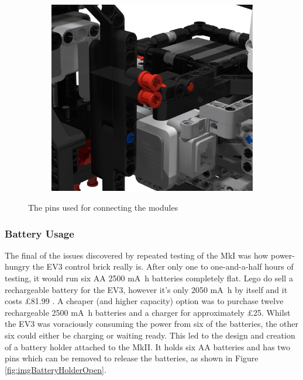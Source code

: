\documentclass{report}
\begin{document}
\begin{figure}[H]
\begin{subfigure}[b]{0.25\textwidth}
			\label{fig:rdrModulePins2}
		\end{subfigure}
		\hspace{10mm}
		\begin{subfigure}[b]{0.25\textwidth}
			\includegraphics[width=\textwidth]{Resources/Images/rdrModulePins3.png}
			\label{fig:rdrModulePins3}
		\end{subfigure}
		\caption{The pins used for connecting the modules}
		\label{fig:rdrModulePins}
	\end{figure}
	
	\subsubsection{Battery Usage}
	
	The final of the issues discovered by repeated testing of the MkI was how power-hungry the EV3 control brick really is. After only one to one-and-a-half hours of testing, it would run six AA 2500 \si{\milli\ampere\hour} batteries completely flat. Lego do sell a rechargeable battery for the EV3, however it's only 2050 \si{\milli\ampere\hour} by itself and it costs \pounds81.99 \cite{Lego2018}. A cheaper (and higher capacity) option was to purchase twelve rechargeable 2500 \si{\milli\ampere\hour} batteries and a charger for approximately \pounds25. Whilst the EV3 was voraciously consuming the power from six of the batteries, the other six could either be charging or waiting ready. This led to the design and creation of a battery holder attached to the MkII. It holds six AA batteries and has two pins which can be removed to release the batteries, as shown in Figure \ref{fig:imgBatteryHolderOpen}.
	
\end{document}
